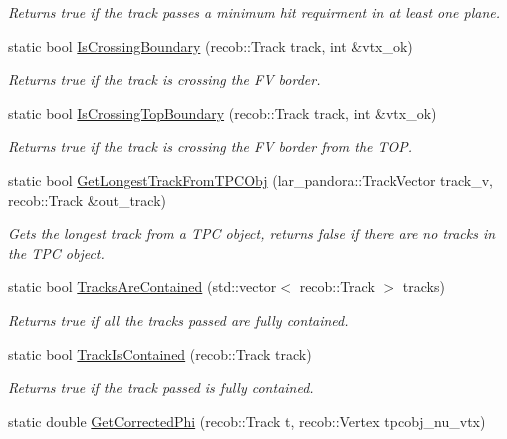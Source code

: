 \begin{DoxyCompactItemize}
\begin{DoxyCompactList}\small\item\em \-Returns true if the track passes a minimum hit requirment in at least one plane. \end{DoxyCompactList}\item 
static bool \hyperlink{classUBXSecHelper_aef82eb512853d8bd9a40fca00f254b7e}{\-Is\-Crossing\-Boundary} (recob\-::\-Track track, int \&vtx\-\_\-ok)
\begin{DoxyCompactList}\small\item\em \-Returns true if the track is crossing the \-F\-V border. \end{DoxyCompactList}\item 
static bool \hyperlink{classUBXSecHelper_af2924ae512f2c8cc5be6feb2bd21a112}{\-Is\-Crossing\-Top\-Boundary} (recob\-::\-Track track, int \&vtx\-\_\-ok)
\begin{DoxyCompactList}\small\item\em \-Returns true if the track is crossing the \-F\-V border from the \-T\-O\-P. \end{DoxyCompactList}\item 
static bool \hyperlink{classUBXSecHelper_a76b009afef0cc69f281ca3215a901f35}{\-Get\-Longest\-Track\-From\-T\-P\-C\-Obj} (lar\-\_\-pandora\-::\-Track\-Vector track\-\_\-v, recob\-::\-Track \&out\-\_\-track)
\begin{DoxyCompactList}\small\item\em \-Gets the longest track from a \-T\-P\-C object, returns false if there are no tracks in the \-T\-P\-C object. \end{DoxyCompactList}\item 
static bool \hyperlink{classUBXSecHelper_a44c8ae9d98197e81da26aeae26c70f0a}{\-Tracks\-Are\-Contained} (std\-::vector$<$ recob\-::\-Track $>$ tracks)
\begin{DoxyCompactList}\small\item\em \-Returns true if all the tracks passed are fully contained. \end{DoxyCompactList}\item 
static bool \hyperlink{classUBXSecHelper_aa0349c7d405ec64cd1b0c7ed3d54a56e}{\-Track\-Is\-Contained} (recob\-::\-Track track)
\begin{DoxyCompactList}\small\item\em \-Returns true if the track passed is fully contained. \end{DoxyCompactList}\item 
static double \hyperlink{classUBXSecHelper_a79b61783bfe19d8dcd33d6aba4c3e61a}{\-Get\-Corrected\-Phi} (recob\-::\-Track t, recob\-::\-Vertex tpcobj\-\_\-nu\-\_\-vtx)

\end{DoxyCompactItemize}
